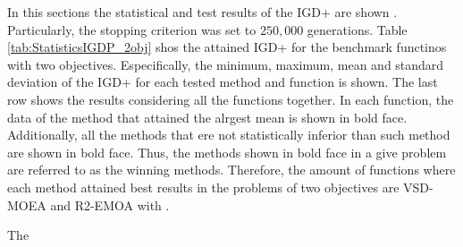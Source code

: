 In this sections the statistical and test results of the IGD+ are shown \cite{Joel:Inverted_Generational_Distance_Plus}.
%
Particularly, the stopping criterion was set to $250,000$ generations.
%
Table \ref{tab:StatisticsIGDP_2obj} shos the attained IGD+ for the benchmark functinos with two objectives.
%
Especifically, the minimum, maximum, mean and standard deviation of the IGD+ for each tested method and function is shown.
%
The last row shows the results considering all the functions together.
%
In each function, the data of the method that attained the alrgest mean is shown in bold face.
%
Additionally, all the methods that ere not statistically inferior than such method are shown in bold face.
%
Thus, the methods shown in bold face in a give problem are referred to as the winning methods.
%
Therefore, the amount of functions where each method attained best results in the problems of two objectives  are VSD-MOEA and R2-EMOA with .
%


The \cite{Joel:WFG}





